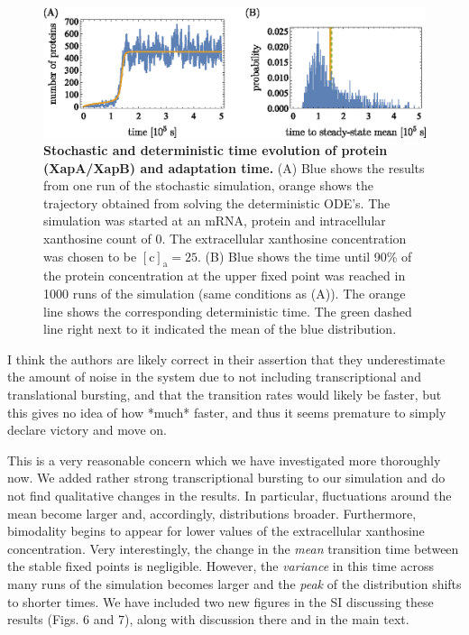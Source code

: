 \documentclass[11pt,letterpaper]{article}
\begin{document}
	\begin{figure}[h!]
		\centering
		\includegraphics{Fig9_evolution.eps}
		\caption{{\bf Stochastic and deterministic time evolution of protein (XapA/XapB) and adaptation time.}
			(A) Blue shows the results from one run of the stochastic simulation, orange shows the trajectory obtained from solving the deterministic ODE's. The simulation was started
			at an mRNA, protein and intracellular xanthosine count of 0. The
			extracellular xanthosine concentration was chosen to be
			$\mathrm{[c]_a} = 25$. (B) Blue shows the time until 90\% of the protein concentration at the upper fixed point was reached in 1000 runs of the simulation (same conditions as (A)). The orange line shows the corresponding deterministic time. The green dashed line right next to it indicated the mean of the blue distribution.}
		\label{adaptationtime}
	\end{figure}

\begin{review}
I think the authors are likely correct in their assertion that they
underestimate the amount of noise in the system due to not including
transcriptional and translational bursting, and that the transition
rates would likely be faster, but this gives no idea of how *much*
faster, and thus it seems premature to simply declare victory and move
on.
\end{review}

\begin{response}
This is a very reasonable concern which we have investigated more
thoroughly now. We added rather strong transcriptional bursting to our
simulation and do not find qualitative changes in the results. In
particular, fluctuations around the mean become larger and, accordingly,
distributions broader. Furthermore, bimodality begins to appear for
lower values of the extracellular xanthosine concentration. Very
interestingly, the change in the \emph{mean} transition time between the
stable fixed points is negligible. However, the \emph{variance} in this
time across many runs of the simulation becomes larger and the
\emph{peak} of the distribution shifts to shorter times. We have
included two new figures in the SI discussing these results (Figs. 6 and
7), along with discussion there and in the main text.
\end{response}
\end{document}
